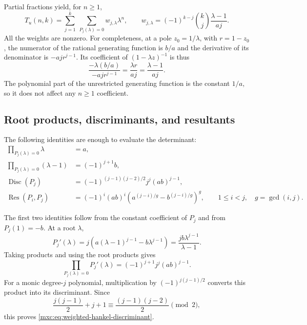 \documentclass[11pt]{article}
\numberwithin{equation}{section}
\theoremstyle{definition}
\theoremstyle{remark}
\begin{document}
Partial fractions yield, for $n\geq1$,
\begin{equation}
 T_u(n,k)=\sum_{j=1}^{k}\ \sum_{P_j(\lambda)=0}
 w_{j,\lambda}\lambda^n,
 \qquad
 w_{j,\lambda}=(-1)^{k-j}\binom{k}{j}
              \frac{\lambda-1}{aj}.
 \label{mxc:eq:weighted-hankel-spectrum}
\end{equation}
All the weights are nonzero.  For completeness, at a pole
$z_0=1/\lambda$, with $r=1-z_0$, the numerator of the rational
generating function is $b/a$ and the derivative of its denominator
is $-aj r^{j-1}$.  Its coefficient of $(1-\lambda z)^{-1}$ is thus
\[
 \frac{-\lambda(b/a)}{-aj r^{j-1}}
 =\frac{\lambda r}{aj}
 =\frac{\lambda-1}{aj}.
\]
The polynomial part of the unrestricted generating function is the
constant $1/a$, so it does not affect any $n\geq1$ coefficient.

\subsection{Root products, discriminants, and resultants}

The following identities are enough to evaluate the determinant:
\begin{align}
 \prod_{P_j(\lambda)=0}\lambda &= a,\\
 \prod_{P_j(\lambda)=0}(\lambda-1)&=(-1)^{j+1}b,
 \label{mxc:eq:weighted-hankel-rootproducts}\\
 \operatorname{Disc}(P_j)
 &=(-1)^{(j-1)(j-2)/2}j^j(ab)^{j-1},
 \label{mxc:eq:weighted-hankel-discriminant}\\
 \operatorname{Res}(P_i,P_j)
 &=(-1)^i(ab)^i
   \left(a^{(j-i)/g}-b^{(j-i)/g}\right)^g,
 \qquad 1\leq i<j,\quad g=\gcd(i,j).
 \label{mxc:eq:weighted-hankel-resultant}
\end{align}

The first two identities follow from the constant coefficient of
$P_j$ and from $P_j(1)=-b$.  At a root $\lambda$,
\[
 P_j'(\lambda)
 =j\left(a(\lambda-1)^{j-1}-b\lambda^{j-1}\right)
 =\frac{jb\lambda^{j-1}}{\lambda-1}.
\]
Taking products and using the root products gives
\[
 \prod_{P_j(\lambda)=0}P_j'(\lambda)
 =(-1)^{j+1}j^j(ab)^{j-1}.
\]
For a monic degree-$j$ polynomial, multiplication by
$(-1)^{j(j-1)/2}$ converts this product into its discriminant.
Since
\[
 \frac{j(j-1)}2+j+1
 \equiv\frac{(j-1)(j-2)}2\pmod2,
\]
this proves \eqref{mxc:eq:weighted-hankel-discriminant}.
\end{document}
